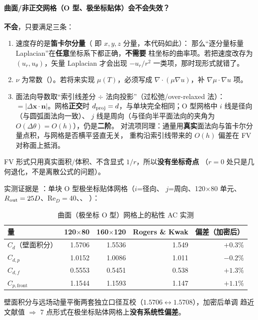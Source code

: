 \paragraph{曲面/非正交网格（O 型、极坐标贴体）会不会失效？}
\textbf{不会}，只要满足三条：
\begin{enumerate}[label=(\arabic*)]
  \item 速度存的是\textbf{笛卡尔分量}（ 即 $x,y,z$ 分量，本代码如此）：
        那么“逐分量标量 Laplacian”在\textbf{任意}坐标系下都正确，\textbf{不需要}
        柱坐标的曲率项。若把速度改存为 $(u_r,u_\theta)$，矢量 Laplacian 才会出现
        $-u_r/r^2$ 一类项，那时现形式就错了。
  \item $\nu$ 为常数（）。若将来实现 $\mu(T)$，必须写成
        $\nabla\cdot(\mu\nabla u)$，补 $\nabla\mu\cdot\nabla u$ 项。
  \item 面法向导数取“索引线差分 $\div$ 法向投影”（过松弛/over-relaxed 法）：
        $=|\Delta\mathbf{x}\cdot\mathbf{n}|$。网格\textbf{正交}时
        $d_{\rm proj}=d$，与单块完全相同；O 型网格中 $i$ 线是径向（与圆弧面法向一致）、
        $j$ 线是周向（与径向半平面法向的夹角为 $O(\Delta\theta)=O(h)$），仍是\textbf{二阶}。
        对流项同理：通量用\textbf{真实}面法向与笛卡尔分量点积，与网格是否横平竖直无关，
        重构沿索引线带来的 $O(h)$ 偏差在 FV 对称面上抵消。
\end{enumerate}
FV 形式只用真实面积/体积、不含显式 $1/r$，所以\textbf{没有坐标奇点}
（$r=0$ 处只是几何退化，不是离散公式的问题）。

实测证据是 ：单块 O 型极坐标贴体网格（$i$=径向、
$j$=周向、120$\times$80 单元、$R_{\rm out}=25D$、Re$_D=40$、、
）：
\begin{table}[htbp]\centering\small
\caption{曲面（极坐标 O 型）网格上的粘性 AC 实测}\label{tab:accurve}
\begin{tabular}{lrrrr}
\toprule
量 & 120$\times$80 & 160$\times$120 & Rogers \& Kwak & 偏差（加密后）\\
\midrule
$C_d$（壁面积分）& 1.5706 & 1.5536 & 1.549 & $+0.3\%$ \\
$C_{d,p}$ & 1.0152 & 1.0086 & 1.011 & $-0.2\%$ \\
$C_{d,f}$ & 0.5553 & 0.5451 & 0.538 & $+1.3\%$ \\
$C_{p,\mathrm{front}}$ & 1.1544 & 1.1593 & 1.147 & $+1.1\%$ \\
\bottomrule
\end{tabular}
\end{table}
壁面积分与远场动量平衡两套独立口径互校（$1.5706\leftrightarrow1.5708$），加密后单调
趋近文献值 $\Rightarrow$ 7 点形式在极坐标贴体网格上\textbf{没有系统性偏差}。

